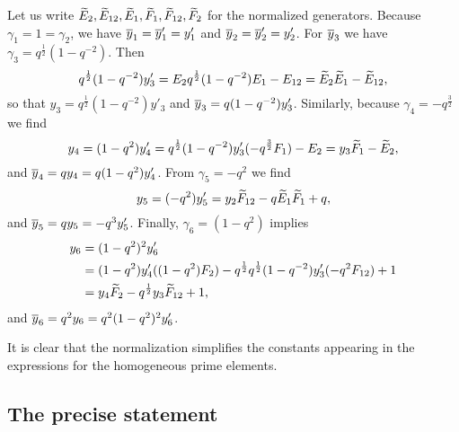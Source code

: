 \begin{example}
	Let us write $\widetilde{E}_2, \widetilde{E}_{12}, \widetilde{E}_1, \widetilde{F}_1, \widetilde{F}_{12}, \widetilde{F}_2$ for the
	normalized generators. Because $\gamma_1 = 1 = \gamma_2$, we have $\overline{y}_1 = \overline{y}'_1 =
		y'_1$ and $\overline{y}_2 = \overline{y}'_2 = y'_2$. For $\overline{y}_3$ we have $\gamma_3 = q^{\frac{1}{2}}(1 -
		q^{-2})$. Then
	\begin{equation*}
		q^{\frac{1}{2}}(1-q^{-2})y'_3 = E_2 q^{\frac{1}{2}}(1-q^{-2})E_1 - E_{12} = \widetilde{E}_2\widetilde{E}_1 - \widetilde{E}_{12},
	\end{equation*}
	so that $y_3 = q^{\frac{1}{2}}(1-q^{-2})y'_3$ and $\overline{y}_3 = q(1 -q^{-2})y'_3$. Similarly, because $\gamma_4 = -q^{\frac{3}{2}}$ we find
	\begin{equation*}
		y_4 = (1-q^2)y'_4 = q^{\frac{1}{2}}(1-q^{-2})y'_3 (-q^{\frac{3}{2}}F_1) - E_2 = y_3 \widetilde{F}_1 - \widetilde{E}_2,
	\end{equation*}
	and $\overline{y}_4 = q y_4 = q(1-q^2)y'_4$. From $\gamma_5 = -q^2$ we find
	\begin{equation*}
		y_5 = (-q^{2})y'_5 = y_2\widetilde{F}_{12} -q \widetilde{E}_1\widetilde{F}_{1} + q,
	\end{equation*}
	and $\overline{y}_5 = q y_5 = -q^{3} y'_5$. Finally, $\gamma_6 = (1-q^2)$ implies
	\begin{align*}
		y_6 & = (1-q^2)^2 y'_6                                                                         \\
		    & = (1-q^2)y'_4 ((1-q^2)F_2) - q^{\frac{1}{2}}q^{\frac{1}{2}}(1-q^{-2})y'_3(-q^2F_{12}) +1 \\
		    & = y_4\widetilde{F}_2 - q^{\frac{1}{2}}y_3\widetilde{F}_{12} + 1,
	\end{align*}
	and $\overline{y}_6 = q^2 y_6 = q^2(1-q^2)^2 y'_6$.

	It is clear that the normalization simplifies the constants appearing in the
	expressions for the homogeneous prime elements.
\end{example}

\subsection{The precise statement}


